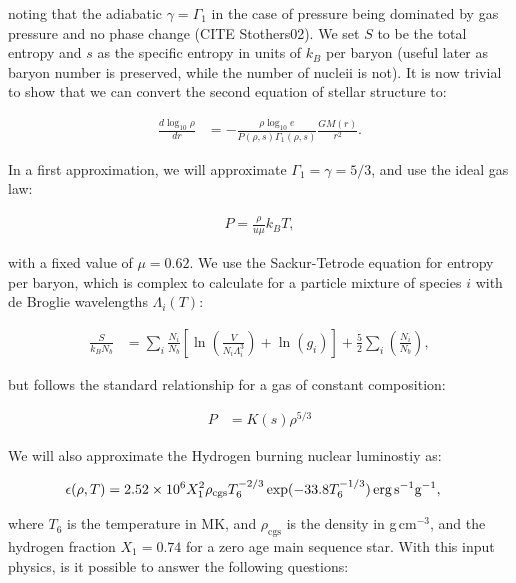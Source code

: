 \documentclass[12pt]{article}
\begin{document}
noting that the adiabatic $\gamma=\Gamma_1$ in the case of pressure being dominated by gas pressure and no phase change (CITE Stothers02).  We set $S$ to be the total entropy and $s$ as the specific entropy in units of $k_B$ per baryon (useful later as baryon number is preserved, while the number of nucleii is not). It is now trivial to show that we can convert the second equation of stellar structure to:

\begin{align}
\frac{d \log_{10} \rho}{dr} &= - \frac{\rho \log_{10}e}{P(\rho, s) \Gamma_1 (\rho, s)} \frac{GM(r)}{r^2}.
\end{align}

In a first approximation, we will approximate $\Gamma_1 = \gamma = 5/3$, and use the ideal gas law:

\begin{align}
P = \frac{\rho}{u \mu} k_B T,
\end{align}

with a fixed value of $\mu=0.62$. We use the Sackur-Tetrode equation for entropy per baryon, which is complex to calculate for a particle mixture of species $i$ with de Broglie wavelengths $\Lambda_i(T)$:

\begin{align}
\frac{S}{k_B N_b} &=  \sum_i \frac{N_i}{N_b} \left[ \ln \left( \frac{V}{N_i \Lambda_i^3} \right) + \ln(g_i)\right]+ \frac{5}{2} \sum_i \left( \frac{N_i}{N_b} \right),
\end{align}

but follows the standard relationship for a gas of constant composition:

\begin{align}
P &= K(s) \rho^{5/3}
\end{align}

We will also approximate the Hydrogen burning nuclear luminostiy as:

\begin{align}
\epsilon(\rho, T) &= 2.52\times 10^6 X_1^2 \rho_\text{cgs} T_6^{-2/3} \exp(-33.8 T_6^{-1/3}) \text{\,erg\,s}^{-1}\text{g}^{-1},
\end{align}

where $T_6$ is the temperature in MK, and $\rho_\text{cgs}$ is the density in g\,cm$^{-3}$, and the hydrogen fraction $X_1=0.74$ for a zero age main sequence star. With this input physics, is it possible to answer the following questions:
\end{document}
